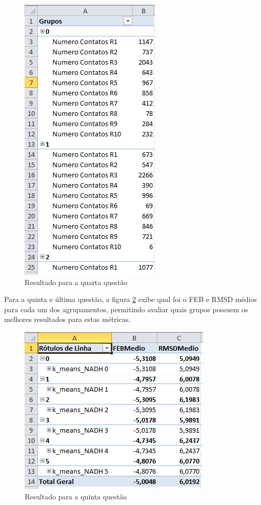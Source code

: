 \begin{figure}[h]
        \center
        \includegraphics[scale=0.7]{images/Questao4.PNG}
        \caption{Resultado para a quarta questão}
        \label{fig:questao4}
\end{figure}

Para a quinta e última questão, a figura \ref{fig:questao5} exibe qual foi o FEB e RMSD médios para cada um dos agrupamentos, permitindo avaliar quais grupos possuem os melhores resultados para estas métricas.

\begin{figure}[h]
        \center
        \includegraphics[scale=0.8]{images/Questao5.PNG}
        \caption{Resultado para a quinta questão}
        \label{fig:questao5}
\end{figure}

